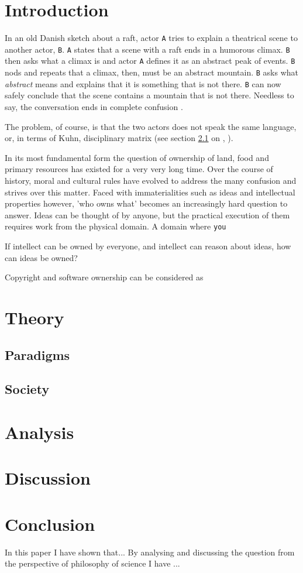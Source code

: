 \documentclass{article}
\begin{document}
\section{Introduction}
In an old Danish sketch about a raft, actor \texttt{A} tries to explain a theatrical scene to another actor, \texttt{B}. \texttt{A} states that a scene with a raft ends in a humorous climax. \texttt{B} then asks what a climax is and actor \texttt{A} defines it as an abstract peak of events. \texttt{B} nods and repeats that a climax, then, must be an abstract mountain. \texttt{B} asks what \textit{abstract} means and explains that it is something that is not there. \texttt{B} can now safely conclude that the scene contains a mountain that is not there. Needless to say, the conversation ends in complete confusion \citep{Raft:2014}.

The problem, of course, is that the two actors does not speak the same language, or, in terms of Kuhn, disciplinary matrix (see section \ref{Theory:Paradigms} on , \cite{Holm:2014}).

In its most fundamental form the question of ownership of land, food and primary resources has existed for a
very very long time. Over the course of history, moral and cultural rules have evolved to address the
many confusion and strives over this matter. Faced with immaterialities such as
ideas and intellectual properties however, 'who owns what' becomes an increasingly hard question to answer. Ideas can be thought of by anyone, but the practical execution of them requires work from the physical domain. A domain where \texttt{you}

If intellect can be owned by everyone, and intellect can reason about ideas, how can ideas be owned? 

Copyright and software ownership can be considered as 

\section{Theory}


\subsection{Paradigms} \label{Theory:Paradigms}

\subsection{Society}

\section{Analysis}

\section{Discussion}

\section{Conclusion}
In this paper I have shown that...
By analysing and discussing the question from the perspective
of philosophy of science I have ...


\end{document}
